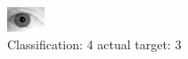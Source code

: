 \begin{figure}[h!]
\begin{center}
\includegraphics[width=0.60\columnwidth]{figures/ID2128_class_4_target_3.png}
\end{center}
\caption{ Classification: 4 actual target: 3}
\label{fig:ID2128_class_4_target_3}
\end{figure}
